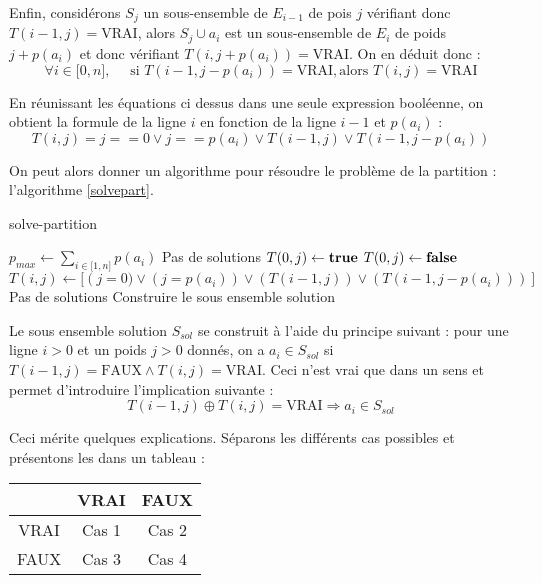 Enfin, considérons $S_j$ un sous-ensemble de $E_{i-1}$ de pois $j$ vérifiant donc $T(i-1, j) =
\mbox{VRAI}$, alors $S_j \cup a_i$ est un sous-ensemble de $E_i$ de poids $j+p(a_i)$ et donc
vérifiant $T(i,j+p(a_i)) = \mbox{VRAI}$. On en déduit donc :
\begin{equation}
	\forall i \in \mathbb{[}0, n \mathbb{]}, \quad \mbox{ si } T(i-1, j-p(a_i)) = \mbox{VRAI}, \mbox{
	alors } T(i,j) = \mbox{VRAI}
\end{equation}

En réunissant les équations ci dessus dans une seule expression booléenne, on obtient la formule de
la ligne $i$ en fonction de la ligne $i-1$ et $p(a_i)$ :
\begin{equation}
	T(i,j) = j == 0 \vee j == p(a_i) \vee T(i-1, j) \vee T(i-1, j-p(a_i))
\end{equation}

On peut alors donner un algorithme pour résoudre le problème de la partition : l'algorithme
\ref{solvepart}.

\begin{algorithm}[H]
	\caption{solve-partition}
	\label{solvepart}
	\begin{algorithmic}[1]
		\STATE $p_{max} \leftarrow \sum_{i \in \mathbb{[}1, n \mathbb{]}} p(a_i)$
			\STATE Pas de solutions
		\ELSE
					\STATE $T(0, j) \leftarrow \textbf{true}{}$
				\ELSE
					\STATE $T(0, j) \leftarrow \textbf{false}{}$
				\ENDIF
			\ENDFOR
					\STATE $T(i, j) \leftarrow [\left (j = 0) \vee (j = p(a_i)) \vee (T(i-1, j)) \vee (T(i-1, j-p(a_i))) \right]$
				\ENDFOR
			\ENDFOR
				\STATE Pas de solutions
			\ELSE
				\STATE Construire le sous ensemble solution
			\ENDIF
		\ENDIF
	\end{algorithmic}
\end{algorithm}
Le sous ensemble solution $S_{sol}$ se construit à l'aide du principe suivant : pour une ligne $i>0$ et
un poids $j>0$ donnés, on a $a_i \in S_{sol}$ si $T(i-1, j) = \mbox{FAUX} \wedge T(i,j) =
\mbox{VRAI}$. Ceci n'est vrai que dans un sens et permet d'introduire l'implication suivante :
\begin{equation}
	\label{ineq}
	T(i-1, j) \oplus T(i, j) = \mbox{VRAI} \Rightarrow a_i \in S_{sol} 
\end{equation}

Ceci mérite quelques explications. Séparons les différents cas possibles et présentons les dans un
tableau : \\
\begin{center}
\begin{tabular}{|c|c|c|} \hline
	\backslashbox{$T(i-1, j)$}{$T(i,j)$} & VRAI & FAUX \\	\hline
	VRAI & Cas 1 & Cas 2 \\ \hline
	FAUX & Cas 3 & Cas 4 \\ \hline
\end{tabular}
\end{center}

